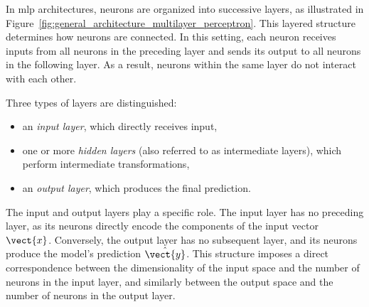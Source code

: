 In \gls{mlp} architectures, neurons are organized into successive layers, as illustrated in Figure~\ref{fig:general_architecture_multilayer_perceptron}.
This layered structure determines how neurons are connected.
In this setting, each neuron receives inputs from all neurons in the preceding layer and sends its output to all neurons in the following layer.
As a result, neurons within the same layer do not interact with each other.



Three types of layers are distinguished:
\begin{itemize}
\item an \emph{input layer}, which directly receives input,
\item one or more \emph{hidden layers} (also referred to as intermediate layers), which perform intermediate transformations,
\item an \emph{output layer}, which produces the final prediction.
\end{itemize}

The input and output layers play a specific role.
The input layer has no preceding layer, as its neurons directly encode the components of the input vector $\vect{x}$.
Conversely, the output layer has no subsequent layer, and its neurons produce the model's prediction $\hat{\vect{y}}$.
This structure imposes a direct correspondence between the dimensionality of the input space and the number of neurons in the input layer, and similarly between the output space and the number of neurons in the output layer.

